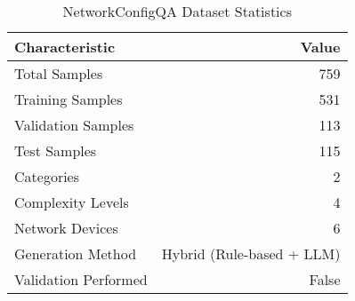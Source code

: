 
\begin{table}[h]
\centering
\caption{NetworkConfigQA Dataset Statistics}
\label{tab:dataset_stats}
\begin{tabular}{lr}
\toprule
\textbf{Characteristic} & \textbf{Value} \\
\midrule
Total Samples & 759 \\
Training Samples & 531 \\
Validation Samples & 113 \\
Test Samples & 115 \\
\midrule
Categories & 2 \\
Complexity Levels & 4 \\
Network Devices & 6 \\
\midrule
Generation Method & Hybrid (Rule-based + LLM) \\
Validation Performed & False \\
\bottomrule
\end{tabular}
\end{table}
        